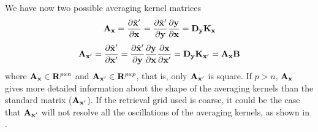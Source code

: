   We have now two possible averaging kernel matrices
  \begin{equation}
    \mathbf{A}_{\mathbf{x}} 
      = \frac{\partial \hat{\mathbf{x}}'}{\partial \mathbf{x}} 
      = \frac{\partial \hat{\mathbf{x}}'}{\partial \mathbf{y}} \frac{\partial \mathbf{y}}{\partial \mathbf{x}}
      = \mathbf{D_y} \mathbf{K_x}
  \end{equation}
  \begin{equation}
    \mathbf{A}_{\mathbf{x}'} 
      = \frac{\partial \hat{\mathbf{x}}'}{\partial \mathbf{x}'} 
      = \frac{\partial\hat{\mathbf{x}}'}{\partial\mathbf{y}}\frac{\partial\mathbf{y}}{\partial\mathbf{x}}
      \frac{\partial\mathbf{x}}{\partial\mathbf{x}'}
      = \mathbf{D_y} \mathbf{K}_{\mathbf{x}'}
      = \mathbf{A}_{\mathbf{x}} \mathbf{B}
  \end{equation}
  where $\mathbf{A}_{\mathbf{x}} \in {\bf R}^{p {\mathrm x} n}$ and $\mathbf{A}_{\mathbf{x}'} \in {\bf R}^{p {\mathrm x} p}$,
  that is, only $\mathbf{A}_{\mathbf{x}'}$ is square. If $p>n$, $\mathbf{A}_{\mathbf{x}}$ gives more
  detailed information about the shape of the averaging kernels than
  the standard matrix ($\mathbf{A}_{\mathbf{x}'}$). If the retrieval grid used is
  coarse, it could be the case that $\mathbf{A}_{\mathbf{x}'}$ will not resolve all
  the oscillations of the averaging kernels, as shown in
  \citet[][Figure 11]{eriksson:99}.

  
  

    





